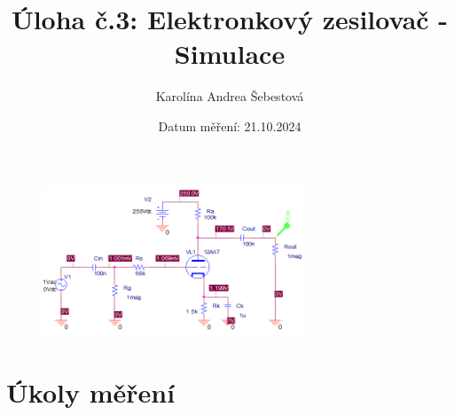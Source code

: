 \documentclass[a4paper, czech]{article}
\title{Úloha č.3: Elektronkový zesilovač - Simulace}
\author{Karolína Andrea Šebestová}
\date{Datum měření: 21.10.2024}
\begin{document}
\maketitle

\begin{figure}[H]
    \centering
    \includegraphics[width=0.7\textwidth]{schema.png}
\end{figure}

\section{Úkoly měření}
\end{document}
